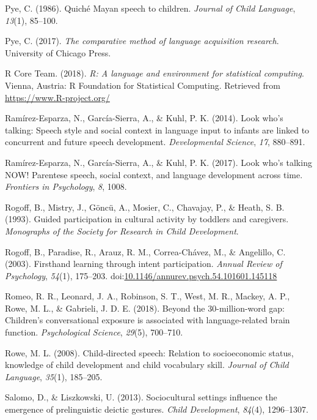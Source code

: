 \documentclass[floatsintext,man]{apa6}
\theoremstyle{definition}
\theoremstyle{definition}
\theoremstyle{definition}
\theoremstyle{remark}
\begin{document}
\hypertarget{ref-pye1986quiche}{}
Pye, C. (1986). Quiché Mayan speech to children. \emph{Journal of Child
Language}, \emph{13}(1), 85--100.

\hypertarget{ref-pye2017comparative}{}
Pye, C. (2017). \emph{The comparative method of language acquisition
research}. University of Chicago Press.

\hypertarget{ref-R-base}{}
R Core Team. (2018). \emph{R: A language and environment for statistical
computing}. Vienna, Austria: R Foundation for Statistical Computing.
Retrieved from \url{https://www.R-project.org/}

\hypertarget{ref-ramirezesparza2014look}{}
Ramírez-Esparza, N., García-Sierra, A., \& Kuhl, P. K. (2014). Look
who's talking: Speech style and social context in language input to
infants are linked to concurrent and future speech development.
\emph{Developmental Science}, \emph{17}, 880--891.

\hypertarget{ref-ramirezesparza2017look}{}
Ramírez-Esparza, N., García-Sierra, A., \& Kuhl, P. K. (2017). Look
who's talking NOW! Parentese speech, social context, and language
development across time. \emph{Frontiers in Psychology}, \emph{8}, 1008.

\hypertarget{ref-rogoff1993guided}{}
Rogoff, B., Mistry, J., Göncü, A., Mosier, C., Chavajay, P., \& Heath,
S. B. (1993). Guided participation in cultural activity by toddlers and
caregivers. \emph{Monographs of the Society for Research in Child
Development}.

\hypertarget{ref-rogoff2003firsthand}{}
Rogoff, B., Paradise, R., Arauz, R. M., Correa-Chávez, M., \& Angelillo,
C. (2003). Firsthand learning through intent participation. \emph{Annual
Review of Psychology}, \emph{54}(1), 175--203.
doi:\href{https://doi.org/10.1146/annurev.psych.54.101601.145118}{10.1146/annurev.psych.54.101601.145118}

\hypertarget{ref-romeo2018beyond}{}
Romeo, R. R., Leonard, J. A., Robinson, S. T., West, M. R., Mackey, A.
P., Rowe, M. L., \& Gabrieli, J. D. E. (2018). Beyond the
30-million-word gap: Children's conversational exposure is associated
with language-related brain function. \emph{Psychological Science},
\emph{29}(5), 700--710.

\hypertarget{ref-rowe2008child}{}
Rowe, M. L. (2008). Child-directed speech: Relation to socioeconomic
status, knowledge of child development and child vocabulary skill.
\emph{Journal of Child Language}, \emph{35}(1), 185--205.

\hypertarget{ref-salomo2013sociocultural}{}
Salomo, D., \& Liszkowski, U. (2013). Sociocultural settings influence
the emergence of prelinguistic deictic gestures. \emph{Child
Development}, \emph{84}(4), 1296--1307.
\end{document}
